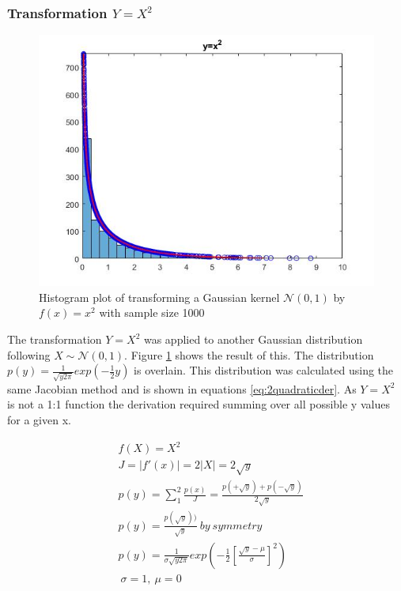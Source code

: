 \documentclass[twoside,twocolumn]{article}
\begin{document}
\subsubsection{Transformation $Y=X^2$}

\begin{figure}[h]
  \centering
    \includegraphics[width=\linewidth]{2quadratic}
  \caption{Histogram plot of transforming a Gaussian kernel $\mathcal{N}(0,1)$ by $f(x)=x^2$ with sample size 1000}
  \label{fig:2quadratic}
\end{figure}

The transformation $Y=X^2$ was applied to another Gaussian distribution following $X\sim\mathcal{N}(0,1)$. Figure \ref{fig:2quadratic} shows the result of this. The distribution $p(y)=\frac{1}{\sqrt{y2\pi}}exp(-\frac{1}{2}y)$ is overlain. This distribution was calculated using the same Jacobian method and is shown in equations \ref{eq:2quadraticder}. As $Y=X^2$ is not a 1:1 function the derivation required summing over all possible y values for a given x.


\begin{equation}
\label{eq:2quadraticder}
\begin{split}
&f(X)=X^2\\
&J=|f'(x)|=2|X|=2\sqrt{y}\\
&p(y) = \sum_{1}^{2} \frac{p(x)}{J} = \frac{p(+\sqrt{y})+p(-\sqrt{y})}{2\sqrt{y}}\\
&p(y)=\frac{p(\sqrt{y}))}{\sqrt{y}}\: by\:symmetry\\
&p(y)=\frac{1}{\sigma\sqrt{y2\pi}}exp(-\frac{1}{2}[\frac{\sqrt{y}-\mu}{\sigma}]^2)\\
&\:\sigma=1,\:\mu=0\\ 
\end{split}
\end{equation} 
\end{document}
